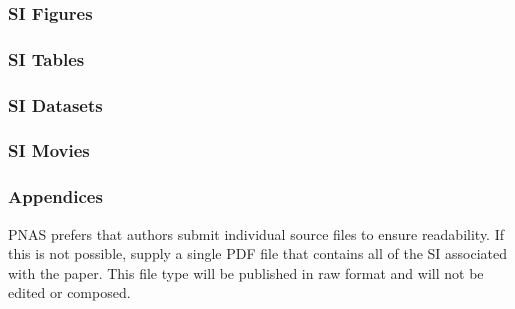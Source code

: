 \documentclass[9pt,twocolumn,twoside]{pnas-new}
\begin{document}
\subsubsection*{SI Figures}


\subsubsection*{SI Tables}


\subsubsection*{SI Datasets} 



\subsubsection*{SI Movies}


\subsubsection*{Appendices}

PNAS prefers that authors submit individual source files to ensure readability. If this is not possible, supply a single PDF file that contains all of the SI associated with the paper. This file type will be published in raw format and will not be edited or composed.
\end{document}
